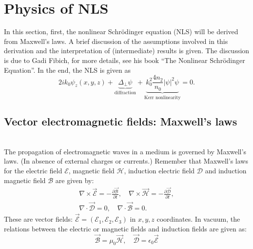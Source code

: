 \section{Physics of NLS}
In this section, first, the nonlinear Schr\"odinger equation (NLS) will be derived from Maxwell's laws.
A brief discussion of the assumptions involved in this derivation
and the interpretation of (intermediate) results is given.
The discussion is due to Gadi Fibich, for more details, see his book
``The Nonlinear Schr\"odinger Equation''.
In the end, the NLS is given as
\begin{equation}
  2ik_0\psi_z(x,y,z) + \underbrace{\Delta_\bot\psi}_{\text{diffraction}}
+ \underbrace{k_0^2\frac{4n_2}{n_0}|\psi|^2\psi}_{\text{Kerr nonlinearity}} = 0.
\end{equation}

\subsection{Vector electromagnetic fields: Maxwell's laws}~\\

The propagation of electromagnetic waves in a medium is governed by Maxwell's laws.
(In absence of external charges or currents.)
Remember that Maxwell's laws for the electric field $\mathcal{E}$, magnetic field $\mathcal{H}$,
induction electric field $\mathcal{D}$ and induction magnetic field $\mathcal{B}$ are given by:
\begin{equation}
\begin{gathered}
    \nabla\times\vec{\mathcal{E}} = -\frac{\partial \vec{\mathcal{B}}}{\partial t},\quad
    \nabla\times\vec{\mathcal{H}} = -\frac{\partial \vec{\mathcal{D}}}{\partial t},\\
    \nabla\cdotp\vec{\mathcal{D}}=0,\quad
    \nabla\cdotp\vec{\mathcal{B}}=0.
\end{gathered}
\end{equation}
These are vector fields: $\vec{\mathcal{E}}=(\mathcal{E}_1,\mathcal{E}_2,\mathcal{E}_3)$ in $x,y,z$ coordinates.
In vacuum, the relations between the electric or magnetic fields and induction fields are given as:
\begin{equation}
    \vec{\mathcal{B}}=\mu_0\vec{\mathcal{H}},\quad \vec{\mathcal{D}}=\epsilon_0\vec{\mathcal{E}}
\end{equation}

